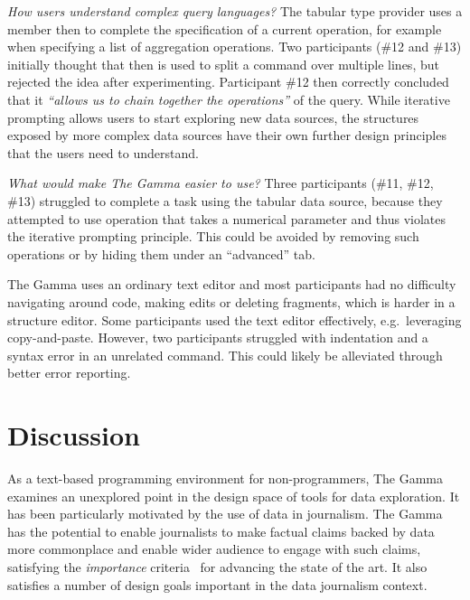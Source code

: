 \documentclass[conference]{IEEEtran}
\newcommand{\ikvd}[1]{{\fontfamily{zi4}\selectfont\small #1}}
\begin{document}
\vspace{0.5em}
\emph{How users understand complex query languages?}
The tabular type provider uses a member \ikvd{then} to complete the specification of a
current operation, for example when specifying a list of aggregation operations. Two participants
(\#12 and \#13) initially thought that \ikvd{then} is used to split a command over multiple lines,
but rejected the idea after experimenting. Participant \#12 then correctly concluded that it
\emph{``allows us to chain together the operations''} of the query. While iterative prompting
allows users to start exploring new data sources, the structures exposed by more complex data
sources have their own further design principles that the users need to understand.

\vspace{0.5em}
\emph{What would make The Gamma easier to use?}
Three participants (\#11, \#12, \#13) struggled to complete a task using the tabular data source,
because they attempted to use operation that takes a numerical parameter and thus
violates the iterative prompting principle. This could be avoided by removing such operations
or by hiding them under an ``advanced'' tab.

The Gamma uses an ordinary text editor and most participants had no difficulty navigating around code,
making edits or deleting fragments, which is harder in a structure editor. Some
participants used the text editor effectively, e.g.~leveraging copy-and-paste. However, two
participants struggled with indentation and a syntax error in an unrelated command. This could
likely be alleviated through better error reporting.


\section{Discussion}
\label{sec:discuss}

\noindent
As a text-based programming environment for non-prog\-ram\-mers, The Gamma examines an unexplored point
in the design space of tools for data exploration. It has been particularly motivated by
the use of data in journalism. The Gamma has the potential to enable journalists
to make factual claims backed by data more commonplace and enable wider audience to engage with
such claims, satisfying the \emph{importance} criteria~\cite{evaluating} for advancing the
state of the art. It also satisfies a number of design goals important in the data journalism
context.
\end{document}
